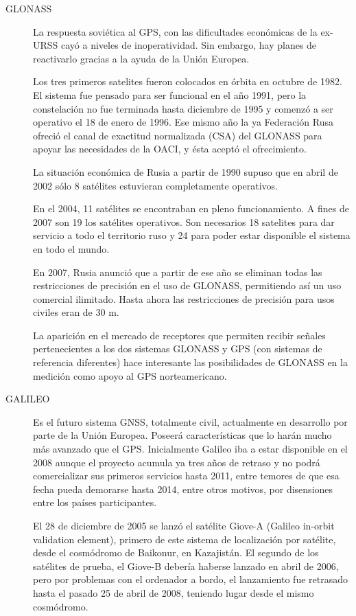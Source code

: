 \begin{description}
    \item [GLONASS] La respuesta sovi\'etica al GPS, con las dificultades econ\'omicas de la ex-URSS cay\'o a niveles de inoperatividad. Sin embargo, hay planes de reactivarlo gracias a la ayuda de la Uni\'on Europea.

Los tres primeros satelites fueron colocados en \'orbita en octubre de 1982. El sistema fue pensado para ser funcional en el a\~no 1991, pero la constelaci\'on no fue terminada hasta diciembre de 1995 y comenz\'o a ser operativo el 18 de enero de 1996. Ese mismo a\~no la ya Federaci\'on Rusa ofreci\'o el canal de exactitud normalizada (CSA) del GLONASS para apoyar las necesidades de la OACI, y \'esta acept\'o el ofrecimiento.

La situaci\'on econ\'omica de Rusia a partir de 1990 supuso que en abril de 2002 s\'olo 8 sat\'elites estuvieran completamente operativos.

En el 2004, 11 sat\'elites se encontraban en pleno funcionamiento. A fines de 2007 son 19 los sat\'elites operativos. Son necesarios 18 satelites para dar servicio a todo el territorio ruso y 24 para poder estar disponible el sistema en todo el mundo.

En 2007, Rusia anunci\'o que a partir de ese a\~no se eliminan todas las restricciones de precisi\'on en el uso de GLONASS, permitiendo as\'i un uso comercial ilimitado. Hasta ahora las restricciones de precisi\'on para usos civiles eran de 30 m.

La aparici\'on en el mercado de receptores que permiten recibir se\~nales pertenecientes a los dos sistemas GLONASS y GPS (con sistemas de referencia diferentes) hace interesante las posibilidades de GLONASS en la medici\'on como apoyo al GPS norteamericano.

    \item [GALILEO] Es el futuro sistema GNSS, totalmente civil, actualmente en desarrollo por parte de la Uni\'on Europea. Poseer\'a caracter\'isticas que lo har\'an mucho m\'as avanzado que el GPS. Inicialmente Galileo iba a estar disponible en el 2008 aunque el proyecto acumula ya tres a\~nos de retraso y no podr\'a comercializar sus primeros servicios hasta 2011, entre temores de que esa fecha pueda demorarse hasta 2014, entre otros motivos, por disensiones entre los pa\'ises participantes.

El 28 de diciembre de 2005 se lanz\'o el sat\'elite Giove-A (Galileo in-orbit validation element), primero de este sistema de localizaci\'on por sat\'elite, desde el cosm\'odromo de Baikonur, en Kazajist\'an. El segundo de los sat\'elites de prueba, el Giove-B deber\'ia haberse lanzado en abril de 2006, pero por problemas con el ordenador a bordo, el lanzamiento fue retrasado hasta el pasado 25 de abril de 2008, teniendo lugar desde el mismo cosm\'odromo.


\end{description}
